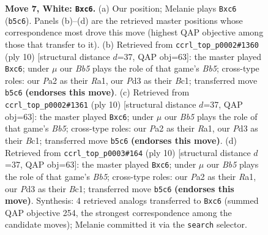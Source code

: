 \documentclass[11pt]{article}
\begin{document}
\begin{figure}[p]
\caption{\textbf{Move 7, White: \texttt{Bxc6}.} (a) Our position; Melanie plays \texttt{Bxc6} (\texttt{b5c6}). Panels (b)--(d) are the retrieved master positions whose correspondence most drove this move (highest QAP objective among those that transfer to it). (b) Retrieved from \texttt{ccrl\_top\_p0002\#1360} (ply 10) [structural distance $d$=37, QAP obj=63]: the master played \texttt{Bxc6}; under $\mu$ our \emph{Bb5} plays the role of that game's \emph{Bb5}; cross-type roles: our \emph{P}a2 as their \emph{R}a1, our \emph{P}d3 as their \emph{B}c1; transferred move \texttt{b5c6} \textbf{(endorses this move)}. (c) Retrieved from \texttt{ccrl\_top\_p0002\#1361} (ply 10) [structural distance $d$=37, QAP obj=63]: the master played \texttt{Bxc6}; under $\mu$ our \emph{Bb5} plays the role of that game's \emph{Bb5}; cross-type roles: our \emph{P}a2 as their \emph{R}a1, our \emph{P}d3 as their \emph{B}c1; transferred move \texttt{b5c6} \textbf{(endorses this move)}. (d) Retrieved from \texttt{ccrl\_top\_p0003\#164} (ply 10) [structural distance $d$=37, QAP obj=63]: the master played \texttt{Bxc6}; under $\mu$ our \emph{Bb5} plays the role of that game's \emph{Bb5}; cross-type roles: our \emph{P}a2 as their \emph{R}a1, our \emph{P}d3 as their \emph{B}c1; transferred move \texttt{b5c6} \textbf{(endorses this move)}. Synthesis: 4 retrieved analogs transferred to \texttt{Bxc6} (summed QAP objective 254, the strongest correspondence among the candidate moves); Melanie committed it via the \texttt{search} selector.}
\label{fig:thought-m12}
\end{figure}

\clearpage
\end{document}

